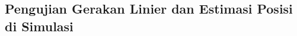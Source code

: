\subsection{Pengujian Gerakan Linier dan Estimasi Posisi di Simulasi}
\label{subsec:liniersimulasi}





\textcolor{red}{\lipsum[1-2]}
